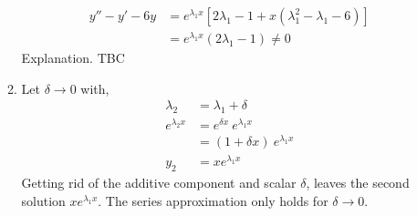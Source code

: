 \begin{enumerate}
\begin{enumerate}
\begin{align}
                        y'' -y' -6y & = e^{\lambda_{1}x}\left[ 2\lambda_{1} - 1 + x(\lambda_{1}^{2} - \lambda_{1} - 6) \right] \\
                                    & = e^{\lambda_{1}x} (2\lambda_{1} - 1) \neq 0
                    \end{align}
                    Explanation. TBC
              \item Let $ \delta \rightarrow 0 $ with,
                    \begin{align}
                        \lambda_{2}       & = \lambda_{1} + \delta           \\
                        e^{\lambda _{2}x} & = e^{\delta x}\ e^{\lambda_{1}x} \\
                         &= (1 + \delta x)\ e^{\lambda_{1}x} \\
                         y_{2} &= xe^{\lambda_{1}x}
                    \end{align}
                    Getting rid of the additive component and scalar $ \delta $, leaves the second
                    solution $ xe^{\lambda_{1}x} $. The series approximation only holds for
                    $ \delta \rightarrow 0 $.
          \end{enumerate}
\end{enumerate}